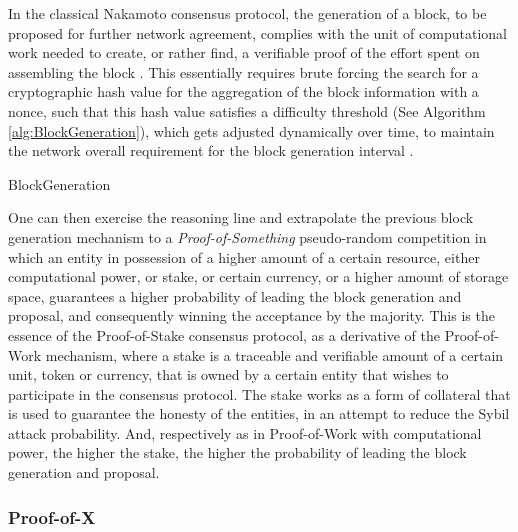 In the classical Nakamoto consensus protocol, the generation of a block, to be proposed for further network agreement, complies with the unit of computational work needed to create, or rather find, a verifiable proof of the effort spent on assembling the block \cite{nakamoto2008bitcoin}. This essentially requires brute forcing the search for a cryptographic hash value for the aggregation of the block information with a nonce, such that this hash value satisfies a difficulty threshold (See Algorithm \ref{alg:BlockGeneration}), which gets adjusted dynamically over time, to maintain the network overall requirement for the block generation interval \cite{8629877, survey-dist-consensus}.

\begin{algorithm} [!h]
	\caption{BlockGeneration} \label{alg:BlockGeneration}
	\BlankLine
\end{algorithm}

One can then exercise the reasoning line and extrapolate the previous block generation mechanism to a \emph{Proof-of-Something} pseudo-random competition in which an entity in possession of a higher amount of a certain resource, either computational power, or stake, or certain currency, or a higher amount of storage space, guarantees a higher probability of leading the block generation and proposal, and consequently winning the acceptance by the majority. This is the essence of the Proof-of-Stake consensus protocol, as a derivative of the Proof-of-Work mechanism, where a stake is a traceable and verifiable amount of a certain unit, token or currency, that is owned by a certain entity that wishes to participate in the consensus protocol. The stake works as a form of collateral that is used to guarantee the honesty of the entities, in an attempt to reduce the Sybil attack probability. And, respectively as in Proof-of-Work with computational power, the higher the stake, the higher the probability of leading the block generation and proposal.

\subsubsection{Proof-of-X}

